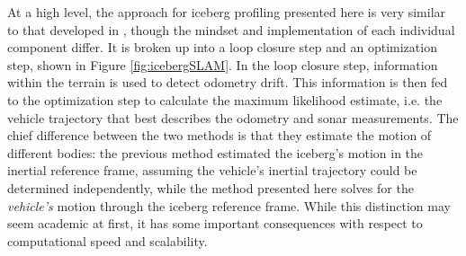 
At a high level, the approach for iceberg profiling presented here is very similar to that developed in \cite{Kimball2011b}, though the mindset and implementation of each individual component differ. It is broken up into a loop closure step and an optimization step, shown in Figure \ref{fig:icebergSLAM}. In the loop closure step, information within the terrain is used to detect odometry drift. This information is then fed to the optimization step to calculate the maximum likelihood estimate, i.e. the vehicle trajectory that best describes the odometry and sonar measurements. The chief difference between the two methods is that they estimate the motion of different bodies: the previous method estimated the iceberg's motion in the inertial reference frame, assuming the vehicle's inertial trajectory could be determined independently, while the method presented here solves for the \emph{vehicle's} motion through the iceberg reference frame. While this distinction may seem academic at first, it has some important consequences with respect to computational speed and scalability. 


